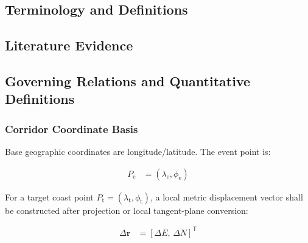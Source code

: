 \subsection{Terminology and Definitions}
\label{sec:res-dat-scn-definitions}


\subsection{Literature Evidence}
\label{sec:res-dat-scn-literature-evidence}

%

\subsection{Governing Relations and Quantitative Definitions}
\label{sec:res-dat-scn-governing-relations}

%

\subsubsection{Corridor Coordinate Basis}
\label{sec:res-dat-scn-corridor-coordinate-basis}

Base geographic coordinates are longitude/latitude. The event point is:

\begin{align}
  P_{\mathrm{e}}
  &=
  \left(
    \lambda_{\mathrm{e}},
    \phi_{\mathrm{e}}
  \right)
  \label{eq:res-dat-scn-event-point}
\end{align}

For a target coast point
$P_{\mathrm{t}}=(\lambda_{\mathrm{t}},\phi_{\mathrm{t}})$, a local
metric displacement vector shall be constructed after projection or
local tangent-plane conversion:

\begin{align}
  \Delta\mathbf{r}
  &=
  \left[
    \Delta E,\,
    \Delta N
  \right]^{\mathsf{T}}
  \label{eq:res-dat-scn-target-displacement}
\end{align}

